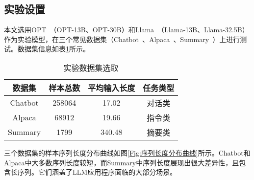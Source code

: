 
\subsection{实验设置}

本文选用OPT~\cite{OPT}（OPT-13B、OPT-30B）和Llama~\cite{Llama}（Llama-13B、Llama-32.5B）作为实验模型，在三个常见数据集（Chatbot~\cite{Chatbot}、Alpaca~\cite{Alpaca}、Summary~\cite{Summary}）上进行测试。数据集信息如表\ref{Table:实验数据集选取}所示。

\begin{table}[H]
  \centering
  \caption{实验数据集选取}
  \label{Table:实验数据集选取}
  \renewcommand{\arraystretch}{1.3}
  \small
  \begin{tabular}{c c c c}
    \toprule
    \textbf{数据集} & \textbf{样本总数} & \textbf{平均输入长度} & \textbf{任务类型} \\
    \midrule
    Chatbot & 258064 & 17.02 & 对话类 \\
    Alpaca & 68912 & 19.66 & 指令类 \\
    Summary & 1799 & 340.48 & 摘要类 \\
    \bottomrule
  \end{tabular}
\end{table}

三个数据集的样本序列长度分布曲线如图\ref{Fig:序列长度分布曲线}所示。Chatbot和Alpaca中大多数序列长度较短，而Summary中序列长度展现出很大差异性，且包含长序列。它们涵盖了LLM应用程序面临的大部分场景。

